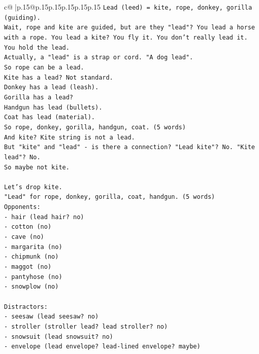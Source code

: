 \documentclass{article}
\begin{document}
{\begin{supertabular}{c@{$\;$}|p{.15\linewidth}@{}p{.15\linewidth}p{.15\linewidth}p{.15\linewidth}p{.15\linewidth}p{.15\linewidth}}
{{{\texttt{Lead (leed) = kite, rope, donkey, gorilla (guiding).} \\
\texttt{Wait, rope and kite are guided, but are they "lead"? You lead a horse with a rope. You lead a kite? You fly it. You don't really lead it. You hold the lead.} \\
\texttt{Actually, a "lead" is a strap or cord. "A dog lead".} \\
\texttt{So rope can be a lead.} \\
\texttt{Kite has a lead? Not standard.} \\
\texttt{Donkey has a lead (leash).} \\
\texttt{Gorilla has a lead?} \\
\texttt{Handgun has lead (bullets).} \\
\texttt{Coat has lead (material).} \\
\texttt{So rope, donkey, gorilla, handgun, coat. (5 words)} \\
\texttt{And kite? Kite string is not a lead.} \\
\texttt{But "kite" and "lead" {-} is there a connection? "Lead kite"? No. "Kite lead"? No.} \\
\texttt{So maybe not kite.} \\
\\ 
\texttt{Let's drop kite.} \\
\texttt{"Lead" for rope, donkey, gorilla, coat, handgun. (5 words)} \\
\texttt{Opponents:} \\
\texttt{{-} hair (lead hair? no)} \\
\texttt{{-} cotton (no)} \\
\texttt{{-} cave (no)} \\
\texttt{{-} margarita (no)} \\
\texttt{{-} chipmunk (no)} \\
\texttt{{-} maggot (no)} \\
\texttt{{-} pantyhose (no)} \\
\texttt{{-} snowplow (no)} \\
\\ 
\texttt{Distractors:} \\
\texttt{{-} seesaw (lead seesaw? no)} \\
\texttt{{-} stroller (stroller lead? lead stroller? no)} \\
\texttt{{-} snowsuit (lead snowsuit? no)} \\
\texttt{{-} envelope (lead envelope? lead{-}lined envelope? maybe)} \\
}}}
\end{supertabular}}
\end{document}
